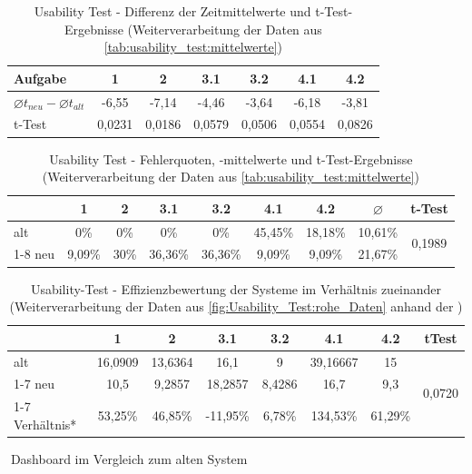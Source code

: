 \begin{table}[H]
    \centering
    \begin{tabular}{|l|c|c|c|c|c|c|}
    \hline
    Aufgabe                                     & 1     & 2     & 3.1   & 3.2     & 4.1   & 4.2 \\ \hline
    $\varnothing t_{neu} - \varnothing t_{alt}$ & -6,55 & -7,14 & -4,46 & -3,64 & -6,18 & -3,81 \\ \hline
    t-Test                                      & 0,0231& 0,0186& 0,0579& 0,0506& 0,0554& 0,0826\\ \hline
    \end{tabular}
    
    \caption{Usability Test - Differenz der Zeitmittelwerte und t-Test-Ergebnisse (Weiterverarbeitung der Daten aus \autoref{tab:usability_test:mittelwerte})}
    \label{tab:usability_test:Differenz+ttest_Zeit}
\end{table}

\begin{table}[H]
    \centering
    \begin{tabular}{|l|c|c|c|c|c|c|c|c|}
    \hline
     & 1      & 2    & 3.1     & 3.2     & 4.1     & 4.2     & $\varnothing$ & t-Test                  \\ \hline
    alt     & 0\%    & 0\%  & 0\%     & 0\%     & 45,45\% & 18,18\% & 10,61\% & \multirow{2}{*}{0,1989} \\ \cline{1-8}
    neu     & 9,09\% & 30\% & 36,36\% & 36,36\% & 9,09\%  & 9,09\%  & 21,67\% &                         \\ \hline
    \end{tabular}
    \caption{Usability Test - Fehlerquoten, -mittelwerte und t-Test-Ergebnisse (Weiterverarbeitung der Daten aus \autoref{tab:usability_test:mittelwerte})}
    \label{tab:usability_test:Differenz+ttest_Fehler}
\end{table}  %

\begin{table}[H]
    \centering
    \begin{tabular}{|l|c|c|c|c|c|c|c|}
        \hline
            & 1 & 2 & 3.1 & 3.2 & 4.1 & 4.2 & tTest \\ \hline
        alt	& 16,0909 & 13,6364 & 16,1 & 9 & 39,16667 & 15 & \multirow{3}{*}{0,0720} \\ \cline{1-7}
        neu	& 10,5 & 9,2857 & 18,2857 & 8,4286 & 16,7 & 9,3	& \\ \cline{1-7}
        Verhältnis* & 53,25\% & 46,85\% & -11,95\% & 6,78\% & 134,53\% & 61,29\% & \\ \hline
    \end{tabular}
    \caption{Usability-Test - Effizienzbewertung der Systeme im Verhältnis zueinander (Weiterverarbeitung der Daten aus \autoref{fig:Usability_Test:rohe_Daten} anhand der )}
    \textcolor{white}{.}\hfill *Dashboard im Vergleich zum alten System
    \label{tab:usability_test:effizienz}
\end{table}
